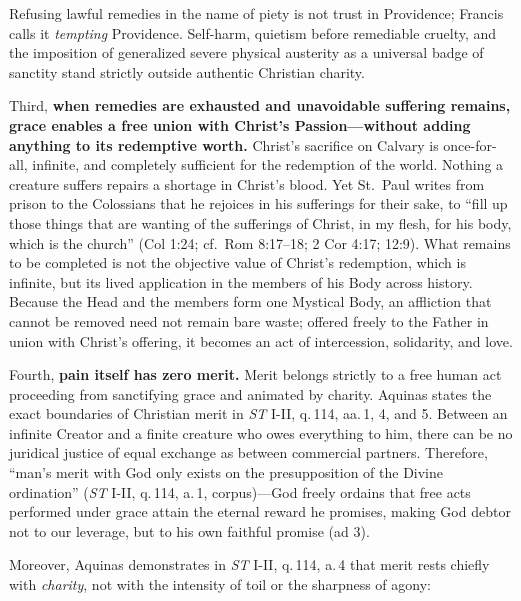 Refusing lawful remedies in the name of piety is not trust in Providence; Francis calls it \emph{tempting} Providence. Self-harm, quietism before remediable cruelty, and the imposition of generalized severe physical austerity as a universal badge of sanctity stand strictly outside authentic Christian charity.

Third, \textbf{when remedies are exhausted and unavoidable suffering remains, grace enables a free union with Christ's Passion---without adding anything to its redemptive worth.} Christ's sacrifice on Calvary is once-for-all, infinite, and completely sufficient for the redemption of the world. Nothing a creature suffers repairs a shortage in Christ's blood. Yet St.\ Paul writes from prison to the Colossians that he rejoices in his sufferings for their sake, to ``fill up those things that are wanting of the sufferings of Christ, in my flesh, for his body, which is the church'' (Col 1:24; cf.\ Rom 8:17--18; 2 Cor 4:17; 12:9). What remains to be completed is not the objective value of Christ's redemption, which is infinite, but its lived application in the members of his Body across history. Because the Head and the members form one Mystical Body, an affliction that cannot be removed need not remain bare waste; offered freely to the Father in union with Christ's offering, it becomes an act of intercession, solidarity, and love.

Fourth, \textbf{pain itself has zero merit.} Merit belongs strictly to a free human act proceeding from sanctifying grace and animated by charity. Aquinas states the exact boundaries of Christian merit in \emph{ST} I-II, q.\,114, aa.\,1, 4, and 5. Between an infinite Creator and a finite creature who owes everything to him, there can be no juridical justice of equal exchange as between commercial partners. Therefore, ``man's merit with God only exists on the presupposition of the Divine ordination'' (\emph{ST} I-II, q.\,114, a.\,1, corpus)---God freely ordains that free acts performed under grace attain the eternal reward he promises, making God debtor not to our leverage, but to his own faithful promise (ad 3).

Moreover, Aquinas demonstrates in \emph{ST} I-II, q.\,114, a.\,4 that merit rests chiefly with \emph{charity}, not with the intensity of toil or the sharpness of agony:

